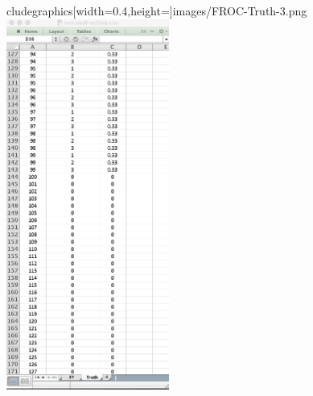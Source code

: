 \documentclass[]{book}
\begin{document}
cludegraphics[width=0.4\textwidth,height=\textheight]{images/FROC-Truth-3.png}\includegraphics[width=0.4\textwidth,height=\textheight]{images/FROC-Truth-4.png}
\end{document}
